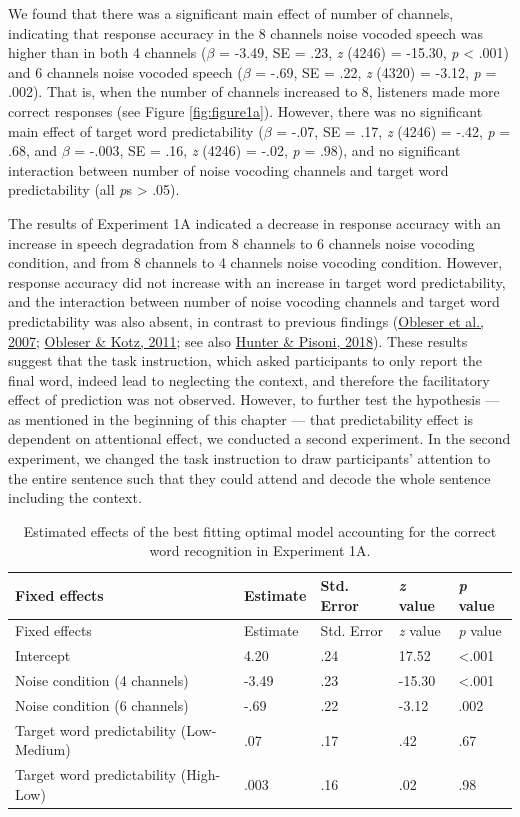 \documentclass[a4paper, nobind]{templates/ociamthesis}
\begin{document}
We found that there was a significant main effect of number of channels, indicating that response accuracy in the 8 channels noise vocoded speech was higher than in both 4 channels (\(\beta\) = -3.49, SE = .23, \emph{z} (4246) = -15.30, \emph{p} \textless{} .001) and 6 channels noise vocoded speech (\(\beta\) = -.69, SE = .22, \emph{z} (4320) = -3.12, \emph{p} = .002).
That is, when the number of channels increased to 8, listeners made more correct responses (see Figure \ref{fig:figure1a}).
However, there was no significant main effect of target word predictability (\(\beta\) = -.07, SE = .17, \emph{z} (4246) = -.42, \emph{p} = .68, and \(\beta\) = -.003, SE = .16, \emph{z} (4246) = -.02, \emph{p} = .98), and no significant interaction between number of noise vocoding channels and target word predictability (all \emph{p}s \textgreater{} .05).

The results of Experiment 1A indicated a decrease in response accuracy with an increase in speech degradation from 8 channels to 6 channels noise vocoding condition, and from 8 channels to 4 channels noise vocoding condition.
However, response accuracy did not increase with an increase in target word predictability,
and the interaction between number of noise vocoding channels and target word predictability was also absent, in contrast to previous findings (\protect\hyperlink{ref-Obleser2007}{Obleser et al., 2007}; \protect\hyperlink{ref-Obleser2011}{Obleser \& Kotz, 2011}; see also \protect\hyperlink{ref-Hunter2018}{Hunter \& Pisoni, 2018}).
These results suggest that the task instruction, which asked participants to only report the final word, indeed lead to neglecting the context, and therefore the facilitatory effect of prediction was not observed.
However, to further test the hypothesis --- as mentioned in the beginning of this chapter --- that predictability effect is dependent on attentional effect, we conducted a second experiment.
In the second experiment, we changed the task instruction to draw participants' attention to the entire sentence such that they could attend and decode the whole sentence including the context.

\begin{longtable}[]{@{}lllll@{}}
\caption{Estimated effects of the best fitting optimal model accounting
for the correct word recognition in Experiment 1A.}
\label{results1a}
\tabularnewline
\toprule
Fixed effects & Estimate & Std. Error & \emph{z} value & \emph{p}
value \\
\midrule
\endfirsthead
\toprule
Fixed effects & Estimate & Std. Error & \emph{z} value & \emph{p}
value \\
\midrule
\endhead
Intercept & 4.20 & .24 & 17.52 & \textless.001 \\
Noise condition (4 channels) & -3.49 & .23 & -15.30 & \textless.001 \\
Noise condition (6 channels) & -.69 & .22 & -3.12 & .002 \\
Target word predictability (Low-Medium) & .07 & .17 & .42 & .67 \\
Target word predictability (High-Low) & .003 & .16 & .02 & .98 \\
\bottomrule
\end{longtable}
\end{document}
